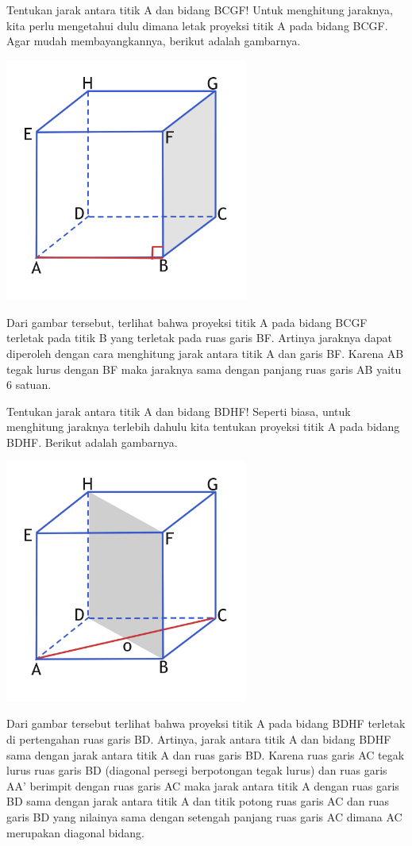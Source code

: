 \documentclass[11pt,fleqn]{book} %
\begin{document}
	Tentukan jarak antara titik A dan bidang BCGF!  Untuk menghitung jaraknya, kita perlu mengetahui dulu dimana letak proyeksi titik A pada bidang BCGF. Agar mudah membayangkannya, berikut adalah gambarnya.


\includegraphics[width = 8cm, height= 8cm]{Pictures/dede4.jpg}

	Dari gambar tersebut, terlihat bahwa proyeksi titik A pada bidang BCGF terletak pada titik B yang terletak pada ruas garis BF. Artinya jaraknya dapat diperoleh dengan cara menghitung jarak antara titik A dan garis BF. Karena AB tegak lurus dengan BF maka jaraknya sama dengan panjang ruas garis AB yaitu 6 satuan.

Tentukan jarak antara titik A dan bidang BDHF!  Seperti biasa, untuk menghitung jaraknya terlebih dahulu kita tentukan proyeksi titik A pada bidang BDHF. Berikut adalah gambarnya.

\includegraphics[width = 8cm, height= 8cm]{Pictures/dede5.jpg}

	Dari gambar tersebut terlihat bahwa proyeksi titik A pada bidang BDHF terletak di pertengahan ruas garis BD. Artinya, jarak antara titik A dan bidang BDHF sama dengan jarak antara titik A dan ruas garis BD. Karena ruas garis AC tegak lurus ruas garis BD (diagonal persegi berpotongan tegak lurus) dan ruas garis AA' berimpit dengan ruas garis AC maka jarak antara titik A dengan ruas garis BD sama dengan jarak antara titik A dan titik potong ruas garis AC dan ruas garis BD yang nilainya sama dengan setengah panjang ruas garis AC dimana AC merupakan diagonal bidang. 
	
\end{document}
